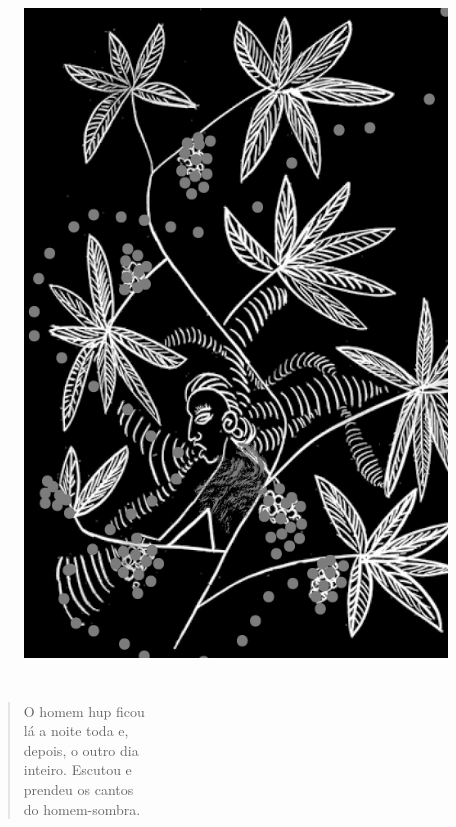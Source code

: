 \begin{figure}
\vspace*{-1.5cm}
\hspace*{-2.4cm}\includegraphics[width=142mm]{./imgs/img3.jpg}
\end{figure}

\chapter*{}

\mbox{}\vspace*{\fill}

\begin{verse}
O homem hup ficou\\
lá a noite toda e,\\
depois, o outro dia\\
inteiro. Escutou e\\
prendeu os cantos\\
do homem-sombra.
\end{verse}

